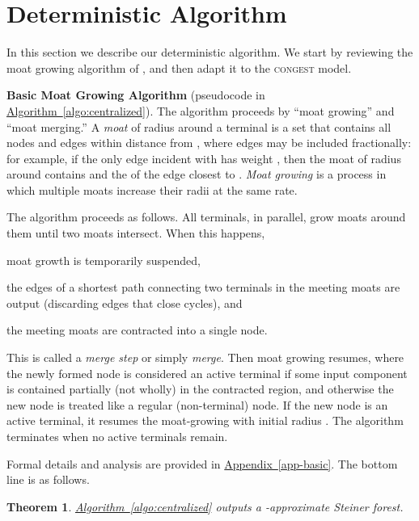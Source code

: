 \documentclass[letterpaper,11pt]{article}
\newtheorem{theorem}{Theorem}[section]
\newcommand{\namedref}[2]{\hyperref[#2]{#1~\ref*{#2}}}
\newcommand{\appendixref}[1]{\namedref{Appendix}{#1}}
\newcommand{\algref}[1]{\namedref{Algorithm}{#1}}
\newcommand{\Congest}{\textsc{congest}\xspace}
\renewcommand{\paragraph}[1]{\smallskip\par\noindent\textbf{#1}}
\begin{document}
\section{Deterministic Algorithm}
\label{sec-alg1}
In this section we describe our deterministic algorithm. We start by
reviewing the moat growing algorithm of \cite{AgrawalKR-95}, and then
adapt it to the \Congest model.

\paragraph{Basic Moat Growing Algorithm}
(pseudocode  
 in \algref{algo:centralized}). The algorithm proceeds by 
``moat growing'' and ``moat merging.'' 
A \emph{moat} of radius  around a terminal
 is a set that contains all
nodes and edges within distance  from , where edges may be
included fractionally: for example, if the only edge
incident with  has 
weight , then the moat of radius  around  contains  and the 
 of the edge closest to . 
\emph{Moat growing} is a process in which multiple moats
increase their radii at the same rate. 

The algorithm proceeds as follows. All terminals, in parallel, grow moats around
them until two moats intersect. When this happens, 
\begin{inparaenum}[(1)]
\item moat growth is temporarily suspended,
\item the edges of a shortest path connecting two terminals in the meeting moats
are output (discarding edges that close cycles), and
\item the meeting  moats are contracted into a single node. 
\end{inparaenum}
This is called a \emph{merge step} or simply \emph{merge}. Then moat growing
resumes, where the newly formed node is considered an active terminal if some
input component is contained partially (not wholly) in the contracted region,
and otherwise the new node is treated like a regular (non-terminal) node. If the
new node is an active terminal, it resumes the moat-growing with initial radius
. The algorithm terminates when no active terminals remain.

Formal details and analysis are provided
in \appendixref{app-basic}. The bottom line is as follows.

\begin{theorem}\label{theorem:2approx}
  \algref{algo:centralized} outputs a -approximate Steiner forest.
\end{theorem}
\end{document}
